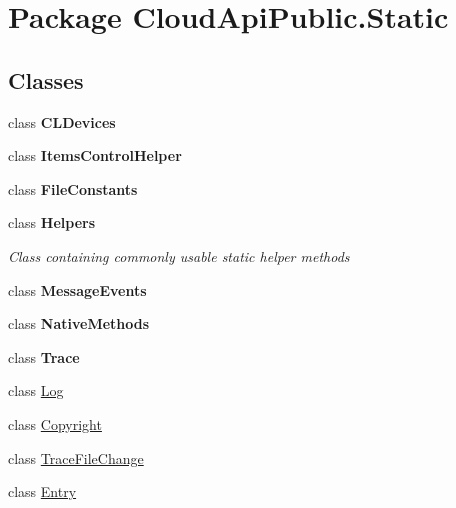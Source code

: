 \hypertarget{namespace_cloud_api_public_1_1_static}{\section{Package Cloud\-Api\-Public.\-Static}
\label{namespace_cloud_api_public_1_1_static}
}
\subsection*{Classes}
\begin{DoxyCompactItemize}
\item 
class {\bfseries C\-L\-Devices}
\item 
class {\bfseries Items\-Control\-Helper}
\item 
class {\bfseries File\-Constants}
\item 
class {\bfseries Helpers}
\begin{DoxyCompactList}\small\item\em Class containing commonly usable static helper methods \end{DoxyCompactList}\item 
class {\bfseries Message\-Events}
\item 
class {\bfseries Native\-Methods}
\item 
class {\bfseries Trace}
\item 
class \hyperlink{class_cloud_api_public_1_1_static_1_1_log}{Log}
\begin{DoxyCompactList}\small\item\em \end{DoxyCompactList}\item 
class \hyperlink{class_cloud_api_public_1_1_static_1_1_copyright}{Copyright}
\begin{DoxyCompactList}\small\item\em \end{DoxyCompactList}\item 
class \hyperlink{class_cloud_api_public_1_1_static_1_1_trace_file_change}{Trace\-File\-Change}
\begin{DoxyCompactList}\small\item\em \end{DoxyCompactList}\item 
class \hyperlink{class_cloud_api_public_1_1_static_1_1_entry}{Entry}
\begin{DoxyCompactList}\small\item\em \end{DoxyCompactList}\item 

\end{DoxyCompactItemize}
